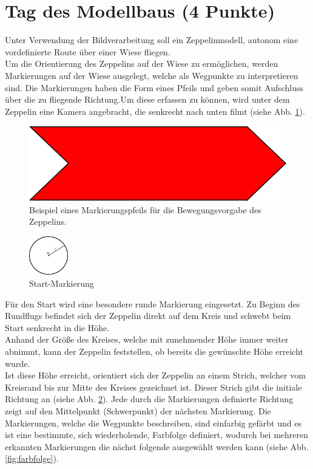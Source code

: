 \documentclass{ezb}
\begin{document}
\newpage
\section{Tag des Modellbaus (4 Punkte)}
Unter Verwendung der Bildverarbeitung soll ein Zeppelinmodell, autonom eine vordefinierte Route über einer Wiese fliegen.\\
\linebreak
Um die Orientierung des Zeppelins auf der Wiese zu ermöglichen, werden Markierungen auf der Wiese ausgelegt, welche als Wegpunkte zu interpretieren sind. Die Markierungen haben die Form eines Pfeils und geben somit Aufschluss über die zu fliegende Richtung.Um diese erfassen zu können, wird unter dem Zeppelin eine Kamera angebracht, die senkrecht nach unten filmt (siehe Abb. \ref{fig1}).\\ 
\begin{figure}[h]
	\centering
  \includegraphics[scale=0.7]{richtungspfeil.png}
	\caption{Beispiel eines Markierungspfeils für die Bewegungsvorgabe des Zeppelins.}
	\label{fig1}
\end{figure}
\linebreak
\begin{figure}
\includegraphics[width=0.15\textwidth]{regelkreis.png}
\caption{\label{fig:kreis}Start-Markierung}
\end{figure}
Für den Start wird eine besondere runde Markierung eingesetzt. Zu Beginn des Rundflugs befindet sich der Zeppelin direkt auf dem Kreis und schwebt beim Start senkrecht in die Höhe.\\ Anhand der Größe des Kreises, welche mit zunehmender Höhe immer weiter abnimmt, kann der Zeppelin feststellen, ob bereits die gewünschte Höhe erreicht wurde.\\
\linebreak
Ist diese Höhe erreicht, orientiert sich der Zeppelin an einem Strich, welcher vom Kreisrand bis zur Mitte des Kreises gezeichnet ist. Dieser Strich gibt die initiale Richtung an (siehe Abb. \ref{fig:kreis}). Jede durch die Markierungen definierte Richtung zeigt auf den Mittelpunkt (Schwerpunkt) der nächsten Markierung. Die Markierungen, welche die Wegpunkte beschreiben, sind einfarbig gefärbt und es ist eine bestimmte, sich wiederholende, Farbfolge definiert, wodurch bei mehreren erkannten Markierungen die nächst folgende ausgewählt werden kann (siehe Abb. \ref{fig:farbfolge}).\\
\end{document}
